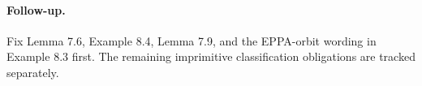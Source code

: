 \documentclass[11pt]{article}
\begin{document}
\paragraph{Follow-up.}
Fix Lemma 7.6, Example 8.4, Lemma 7.9, and the
EPPA-orbit wording in Example 8.3 first.
The remaining imprimitive classification obligations
are tracked separately.
\end{document}
